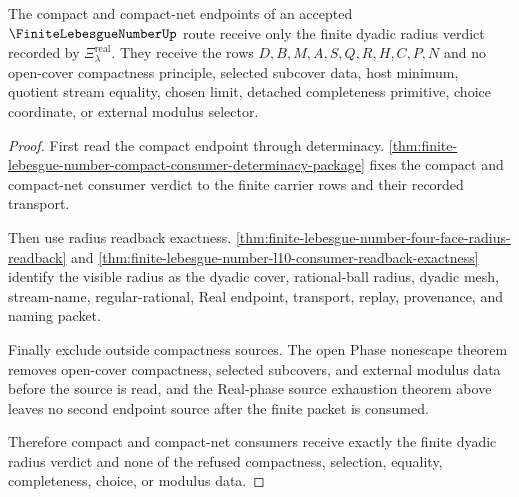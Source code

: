 \begin{theorem}
\label{thm:finite-lebesgue-number-compact-consumer-source-verdict}
The compact and compact-net endpoints of an accepted $\FiniteLebesgueNumberUp$ route receive only the finite dyadic radius verdict recorded by $\Xi_{\lambda}^{\mathrm{real}}$. They receive the rows $D,B,M,A,S,Q,R,H,C,P,N$ and no open-cover compactness principle, selected subcover data, host minimum, quotient stream equality, chosen limit, detached completeness primitive, choice coordinate, or external modulus selector.
\end{theorem}
\begin{proof}
First read the compact endpoint through determinacy. \autoref{thm:finite-lebesgue-number-compact-consumer-determinacy-package} fixes the compact and compact-net consumer verdict to the finite carrier rows and their recorded transport.

Then use radius readback exactness. \autoref{thm:finite-lebesgue-number-four-face-radius-readback} and \autoref{thm:finite-lebesgue-number-l10-consumer-readback-exactness} identify the visible radius as the dyadic cover, rational-ball radius, dyadic mesh, stream-name, regular-rational, Real endpoint, transport, replay, provenance, and naming packet.

Finally exclude outside compactness sources. The open Phase nonescape theorem removes open-cover compactness, selected subcovers, and external modulus data before the source is read, and the Real-phase source exhaustion theorem above leaves no second endpoint source after the finite packet is consumed.

Therefore compact and compact-net consumers receive exactly the finite dyadic radius verdict and none of the refused compactness, selection, equality, completeness, choice, or modulus data.
\end{proof}

